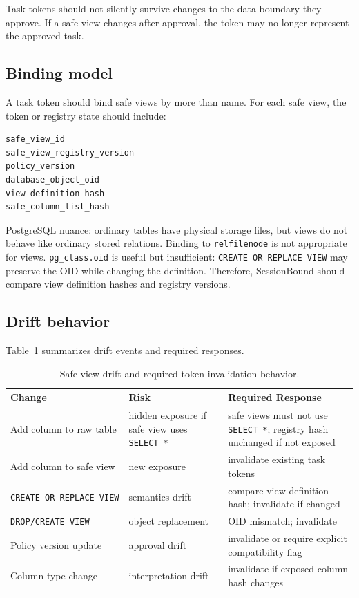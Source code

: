 \documentclass[
]{article}
\begin{document}
Task tokens should not silently survive changes to the data boundary
they approve. If a safe view changes after approval, the token may no
longer represent the approved task.

\hypertarget{binding-model}{%
\subsection{Binding model}\label{binding-model}}

A task token should bind safe views by more than name. For each safe
view, the token or registry state should include:

\begin{verbatim}
safe_view_id
safe_view_registry_version
policy_version
database_object_oid
view_definition_hash
safe_column_list_hash
\end{verbatim}

PostgreSQL nuance: ordinary tables have physical storage files, but
views do not behave like ordinary stored relations. Binding to
\texttt{relfilenode} is not appropriate for views.
\texttt{pg\_class.oid} is useful but insufficient:
\texttt{CREATE\ OR\ REPLACE\ VIEW} may preserve the OID while changing
the definition. Therefore, SessionBound should compare view definition
hashes and registry versions.

\hypertarget{drift-behavior}{%
\subsection{Drift behavior}\label{drift-behavior}}

Table~\ref{tab:schema-drift} summarizes drift events and required
responses.

\begin{table}[t]
\centering
\small
\caption{Safe view drift and required token invalidation behavior.}
\label{tab:schema-drift}
\begin{tabular}{@{}
  >{\raggedright\arraybackslash}p{}
  >{\raggedright\arraybackslash}p{}
  >{\raggedright\arraybackslash}p{}@{}}
\toprule
Change & Risk & Required Response \\
\midrule
Add column to raw table & hidden exposure if safe view uses
\texttt{SELECT\ *} & safe views must not use \texttt{SELECT\ *};
registry hash unchanged if not exposed \\
Add column to safe view & new exposure & invalidate existing task
tokens \\
\texttt{CREATE\ OR\ REPLACE\ VIEW} & semantics drift & compare view
definition hash; invalidate if changed \\
\texttt{DROP/CREATE\ VIEW} & object replacement & OID mismatch;
invalidate \\
Policy version update & approval drift & invalidate or require explicit
compatibility flag \\
Column type change & interpretation drift & invalidate if exposed column
hash changes \\
\bottomrule
\end{tabular}
\end{table}
\end{document}
